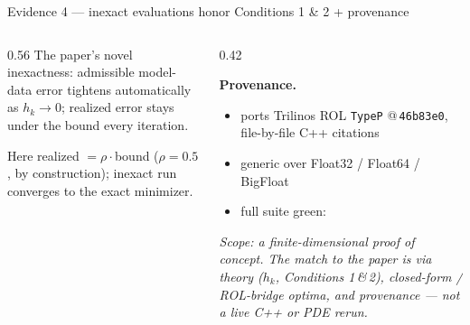 \documentclass[aspectratio=169,10pt]{beamer}
\newcommand{\fdata}[1]{data/#1}
\begin{document}
\begin{frame}{Evidence 4 --- inexact evaluations honor Conditions 1 \& 2 + provenance}
  \small
  \begin{columns}[T]
  \begin{column}{0.56\textwidth}
   The paper's novel inexactness: admissible model-data error tightens
   automatically as $h_k\!\to\!0$; realized error stays under the bound every iteration.
   \begin{center}
   \end{center}
   {\footnotesize Here realized $=\rho\cdot$bound ($\rho{=}0.5$, by construction); inexact run converges to the exact minimizer.}
  \end{column}
  \begin{column}{0.42\textwidth}
   {\footnotesize\centering\par}
   \medskip
   \textbf{Provenance.}
   \begin{itemize}\footnotesize\setlength\itemsep{2pt}
    \item ports Trilinos ROL \texttt{TypeP} @\,\texttt{46b83e0}, file-by-file C++ citations
    \item generic over Float32 / Float64 / BigFloat
    \item full suite green: 
   \end{itemize}
   \smallskip
   {\scriptsize\itshape Scope: a finite-dimensional proof of concept. The match to the
   paper is via theory ($h_k$, Conditions 1\,\&\,2), closed-form / ROL-bridge optima,
   and provenance --- not a live C++ or PDE rerun.}
  \end{column}
  \end{columns}
\end{frame}
\end{document}
